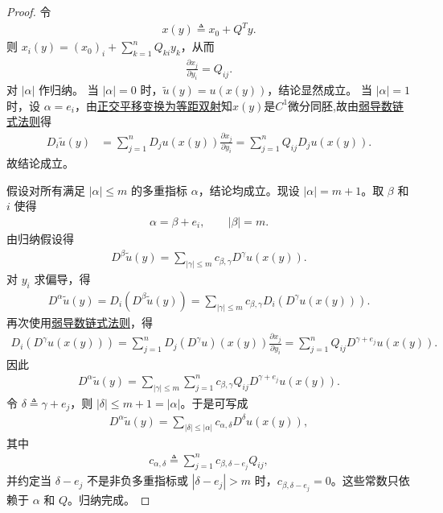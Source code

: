 \documentclass[../../main.tex]{subfiles}%
\begin{document}
\begin{proof}

令
\begin{align*}
x(y)\triangleq x_0+Q^T y.
\end{align*}
则 $x_i(y)=(x_0)_i+\sum\limits_{k=1}^n Q_{ki}y_k$，从而
\begin{align*}
\frac{\partial x_j}{\partial y_i}=Q_{ij}.
\end{align*}
对 $|\alpha|$ 作归纳。
当 $|\alpha|=0$ 时，$\tilde u(y)=u(x(y))$，结论显然成立。
当 $|\alpha|=1$ 时，设 $\alpha=e_i$，由\hyperref[lemma:正交平移变换为等距双射]{正交平移变换为等距双射}知$x(y)$是$C^1$微分同胚,故由\hyperref[theorem:弱导数链式法则]{弱导数链式法则}得
\begin{align*}
D_i\tilde u(y)
&=\sum\limits_{j=1}^n D_j u(x(y))\frac{\partial x_j}{\partial y_i}
=\sum\limits_{j=1}^n Q_{ij}D_j u(x(y)).
\end{align*}
故结论成立。

假设对所有满足 $|\alpha|\leqslant m$ 的多重指标 $\alpha$，结论均成立。现设 $|\alpha|=m+1$。取 $\beta$ 和 $i$ 使得
\begin{align*}
\alpha=\beta+e_i,\qquad |\beta|=m.
\end{align*}
由归纳假设得
\begin{align*}
D^\beta\tilde u(y)=\sum\limits_{|\gamma|\leqslant m}c_{\beta,\gamma}D^\gamma u(x(y)).
\end{align*}
对 $y_i$ 求偏导，得
\begin{align*}
D^\alpha\tilde u(y)
=D_i\left(D^\beta\tilde u(y)\right)
=\sum\limits_{|\gamma|\leqslant m}c_{\beta,\gamma}D_i\left(D^\gamma u(x(y))\right).
\end{align*}
再次使用\hyperref[theorem:弱导数链式法则]{弱导数链式法则}，得
\begin{align*}
D_i\left(D^\gamma u(x(y))\right)
=\sum\limits_{j=1}^n D_j\left(D^\gamma u\right)(x(y))\frac{\partial x_j}{\partial y_i}
=\sum\limits_{j=1}^n Q_{ij}D^{\gamma+e_j}u(x(y)).
\end{align*}
因此
\begin{align*}
D^\alpha\tilde u(y)
=\sum\limits_{|\gamma|\leqslant m}\sum\limits_{j=1}^n c_{\beta,\gamma}Q_{ij}D^{\gamma+e_j}u(x(y)).
\end{align*}
令 $\delta\triangleq\gamma+e_j$，则 $|\delta|\leqslant m+1=|\alpha|$。于是可写成
\begin{align*}
D^\alpha\tilde u(y)
=\sum\limits_{|\delta|\leqslant|\alpha|}c_{\alpha,\delta}D^\delta u(x(y)),
\end{align*}
其中
\begin{align*}
c_{\alpha,\delta}\triangleq\sum\limits_{j=1}^n c_{\beta,\delta-e_j}Q_{ij},
\end{align*}
并约定当 $\delta-e_j$ 不是非负多重指标或 $|\delta-e_j|>m$ 时，$c_{\beta,\delta-e_j}=0$。这些常数只依赖于 $\alpha$ 和 $Q$。归纳完成。
\end{proof}
\end{document}
